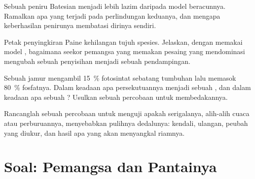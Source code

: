 \begin{exercise}[$\star\star$]\label{exo:b1:species-interactions:9}
Sebuah peniru Batesian menjadi lebih lazim daripada model beracunnya.
Ramalkan apa yang terjadi pada perlindungan keduanya, dan mengapa
keberhasilan penirunya membatasi dirinya sendiri.
\end{exercise}

\begin{exercise}[$\star\star\star$]\label{exo:b1:species-interactions:10}
Petak penyingkiran Paine kehilangan tujuh spesies. Jelaskan, dengan
memakai model , bagaimana seekor pemangsa yang memakan
pesaing yang mendominasi mengubah sebuah penyisihan menjadi sebuah
pendampingan.
\end{exercise}

\begin{exercise}[$\star\star\star$]\label{exo:b1:species-interactions:11}
Sebuah jamur  mengambil \qty{15}{\%} fotosintat sebatang
tumbuhan lalu memasok \qty{80}{\%} fosfatnya. Dalam keadaan apa
persekutuannya menjadi sebuah , dan dalam keadaan apa sebuah
? Usulkan sebuah percobaan untuk membedakannya.
\end{exercise}

\begin{exercise}[$\star\star\star$]\label{exo:b1:species-interactions:12}
Rancanglah sebuah percobaan untuk menguji apakah serigalanya,
alih-alih cuaca atau perburuannya, menyebabkan pulihnya dedalunya:
kendali, ulangan, peubah yang diukur, dan hasil apa yang akan
menyangkal riamnya.
\end{exercise}

\section{Soal: Pemangsa dan Pantainya}

